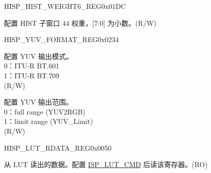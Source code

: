 \begin{register}{H}{ISP\_HIST\_WEIGHT6\_REG}{0x01DC}\label{regdesc:ISPHISTWEIGHT6REG}
%
%
\regnewline%
\begin{regdesc}\begin{reglist}
\label{fielddesc:ISPHISTWEIGHT44}\item [ISP\_HIST\_WEIGHT\_44] 配置 HIST 子窗口 44 权重，[7:0] 为小数。(R/W)
\end{reglist}\end{regdesc}
\end{register}












\begin{register}{H}{ISP\_YUV\_FORMAT\_REG}{0x0234}\label{regdesc:ISPYUVFORMATREG}
%
%
%
\regnewline%
\begin{regdesc}\begin{reglist}
\label{fielddesc:ISPYUVMODE}\item [ISP\_YUV\_MODE] 配置 YUV 输出模式。\\0：ITU-R BT.601\\1：ITU-R BT.709\\(R/W)
\label{fielddesc:ISPYUVRANGE}\item [ISP\_YUV\_RANGE] 配置 YUV 输出范围。\\0：full range (YUV2RGB)\\1：limit range (YUV\_Limit)\\(R/W)
\end{reglist}\end{regdesc}
\end{register}


\begin{register}{H}{ISP\_LUT\_RDATA\_REG}{0x0050}\label{regdesc:ISPLUTRDATAREG}
%
\regnewline%
\begin{regdesc}\begin{reglist}
\label{fielddesc:ISPLUTRDATA}\item [ISP\_LUT\_RDATA] 从 LUT 读出的数据。配置 \hyperref[fielddesc:ISPLUTCMD]{ISP\_LUT\_CMD} 后读该寄存器。(RO)
\end{reglist}\end{regdesc}
\end{register}


